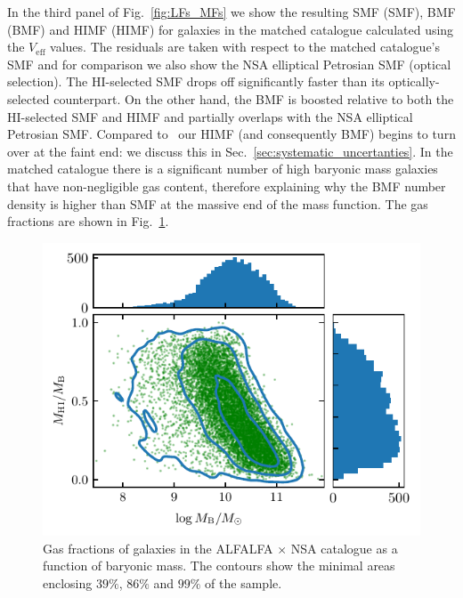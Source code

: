 \documentclass[usenatbib,useAMS]{mnras}
\newcommand{\HI}{\ensuremath{\mathrm{H}\scriptstyle\mathrm{I}}}
\newcommand{\Veff}{\ensuremath{V_{\mathrm{eff}}}}
\newcommand{\matched}{ALFALFA $\times$ NSA }
\begin{document}
In the third panel of Fig.~\ref{fig:LFs_MFs} we show the resulting \acl{SMF} (SMF), \acl{BMF} (BMF) and \acl{HIMF} (HIMF) for galaxies in the matched catalogue calculated using the $\Veff$ values. The residuals are taken with respect to the matched catalogue's \ac{SMF} and for comparison we also show the \ac{NSA} elliptical Petrosian \ac{SMF} (optical selection). The $\HI$-selected \ac{SMF} drops off significantly faster than its optically-selected counterpart. On the other hand, the \ac{BMF} is boosted relative to both the $\HI$-selected \ac{SMF} and \ac{HIMF} and partially overlaps with the \ac{NSA} elliptical Petrosian \ac{SMF}. Compared to~\citet{Jones2018} our \ac{HIMF} (and consequently \ac{BMF}) begins to turn over at the faint end: we discuss this in Sec.~\ref{sec:systematic_uncertanties}. In the matched catalogue there is a significant number of high baryonic mass galaxies that have non-negligible gas content, therefore explaining why the \ac{BMF} number density is higher than \ac{SMF} at the massive end of the mass function. The gas fractions are shown in Fig.~\ref{fig:gas_fraction}.



\begin{figure}
    \centering
    \includegraphics[width=1.0\columnwidth]{Figures/gas_fraction.pdf}
    \caption{Gas fractions of galaxies in the \matched catalogue as a function of baryonic mass. The contours show the minimal areas enclosing $39\%$, $86\%$ and $99\%$ of the sample.}
    \label{fig:gas_fraction}
\end{figure}
\end{document}
